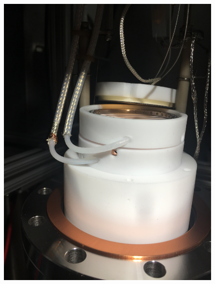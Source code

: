 \begin{figure}[htbp]
    \begin{minipage}{0.32\textwidth}
    \includegraphics[width=\linewidth, angle=270]{figures/testbed/ft6_1.jpg}
    \end{minipage}
    \hspace{\fill} %
    \begin{minipage}{0.32\textwidth}

\end{minipage}
\end{figure}
